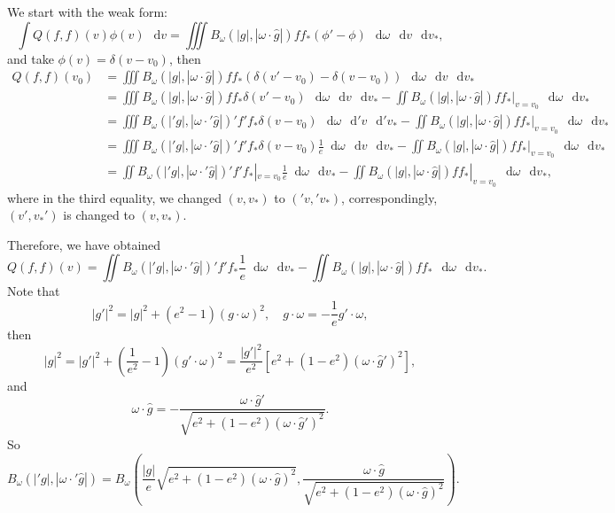 \documentclass[review, times]{elsarticle}
\newcommand*\diff{\mathop{}\!\mathrm{d}}
\begin{document}
We start with the weak form:
\begin{equation} \label{weak1}
\int Q(f,f)(v)\phi(v)\,\diff{v}=\iiint B_{\omega}(|g|,|\omega\cdot \hat{g}|)ff_*(\phi'-\phi)\,\diff{\omega}\,\diff{v}\,\diff{v_*},
\end{equation}
and take $\phi(v)=\delta(v-v_0)$, then
\begin{align}
  Q(f,f)(v_0)&=\iiint B_{\omega}(|g|,|\omega\cdot \hat{g}|)ff_*(\delta(v'-v_0)-\delta(v-v_0))\,\diff{\omega}\,\diff{v}\,\diff{v_*}\nonumber\\
  &=\iiint B_{\omega}(|g|,|\omega\cdot \hat{g}|)ff_*\delta(v'-v_0)\,\diff{\omega}\,\diff{v}\,\diff{v_*}-\iint B_{\omega}(|g|,|\omega\cdot \hat{g}|)ff_*|_{v=v_0}\,\diff{\omega}\,\diff{v_*}\nonumber\\
  &=\iiint B_{\omega}(|'g|,|\omega\cdot '\hat{g}|)'f'f_*\delta(v-v_0)\,\diff{\omega}\,\diff{'v}\,\diff{'v_*}-\iint B_{\omega}(|g|,|\omega\cdot \hat{g}|)ff_*|_{v=v_0}\,\diff{\omega}\,\diff{v_*}\nonumber\\
  &=\iiint B_{\omega}(|'g|,|\omega\cdot '\hat{g}|)'f'f_*\delta(v-v_0) \frac{1}{e}\diff{\omega}\,\diff{v}\,\diff{v_*}-\iint B_{\omega}(|g|,|\omega\cdot \hat{g}|)ff_*|_{v=v_0}\,\diff{\omega}\,\diff{v_*}\nonumber\\
  &=\iint B_{\omega}(|'g|,|\omega\cdot '\hat{g}|)'f'f_*|_{v=v_0} \frac{1}{e}\diff{\omega}\,\diff{v_*}-\iint B_{\omega}(|g|,|\omega\cdot \hat{g}|)ff_*|_{v=v_0}\,\diff{\omega}\,\diff{v_*},
\end{align}
where in the third equality, we changed $(v,v_*)$ to $('v,'v_*)$, correspondingly, $(v',v_*')$ is changed to $(v,v_*)$.

Therefore, we have obtained
\begin{equation}
Q(f,f)(v)=\iint B_{\omega}(|'g|,|\omega\cdot '\hat{g}|)'f'f_* \frac{1}{e}\diff{\omega}\,\diff{v_*}-\iint B_{\omega}(|g|,|\omega\cdot \hat{g}|)ff_*\,\diff{\omega}\,\diff{v_*}.
\end{equation}
Note that
\begin{equation}
|g'|^2=|g|^2+(e^2-1)(g\cdot \omega)^2, \quad g\cdot \omega=-\frac{1}{e}g'\cdot\omega,
\end{equation}
then
\begin{equation}
|g|^2=|g'|^2+(\frac{1}{e^2}-1)(g'\cdot \omega)^2=\frac{|g'|^2}{e^2}[e^2+(1-e^2)(\omega \cdot \hat{g}')^2],
\end{equation}
and
\begin{equation}
\omega\cdot \hat{g}=-\frac{\omega\cdot\hat{g}'}{\sqrt{e^2+(1-e^2)(\omega\cdot \hat{g}')^2}}.
\end{equation}
So
\begin{equation}
B_{\omega}(|'g|,|\omega\cdot '\hat{g}|)=B_{\omega}\left(\frac{|g|}{e}\sqrt{e^2+(1-e^2)(\omega\cdot \hat{g})^2}, \frac{\omega \cdot \hat{g}}{\sqrt{e^2+(1-e^2)(\omega\cdot \hat{g})^2}}\right).
\end{equation}
\end{document}
